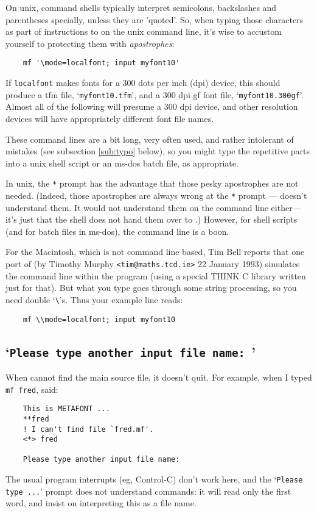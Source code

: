 On {\sc unix}, command shells typically interpret semicolons,
backslashes and parentheses specially, unless they are 'quoted'.
So, when typing those characters as part of instructions to \MF{}
on the {\sc unix} command line, it's wise to accustom
yourself to protecting them with {\em apostrophes\/}:
\begin{verbatim}
    mf '\mode=localfont; input myfont10'
\end{verbatim}
If {\tt localfont} makes fonts for a 300 dots per inch (dpi) device,
this should produce a {\sc tfm} file, `{\tt myfont10.tfm}',
and a 300 dpi {\sc gf} font file, `{\tt myfont10.300gf}'.
Almost all of the following will presume a 300 dpi device, and other
resolution devices will have appropriately different font file names.

These command lines are a bit long, very often used, and rather
intolerant of mistakes (see subsection \ref{sub:typo} below),
so you might type the repetitive parts into a {\sc unix} shell script
or an {\sc ms-dos} batch file, as appropriate.

In {\sc unix}, the {\tt **} prompt has the advantage that those pesky
apostrophes are not needed.  (Indeed, those apostrophes are always
wrong at the {\tt **} prompt --- \MF{} doesn't understand them.
It would not understand them on the command line either---it's just
that the shell does not hand them over to \MF{}.)
However, for shell scripts (and for batch files in {\sc ms-dos}),
the command line is a boon.

For the Macintosh, which is not command line based,
Tim {\sc Bell} reports that one port of \MF{}
(by Timothy {\sc Murphy\/} {\tt <tim@maths.tcd.ie>} 22 January 1993)
simulates the command line within the program
(using a special THINK C library written just for that).
But what you type goes through some string processing,
so you need double `\verb+\+'s.
Thus your example line reads:
\begin{verbatim}
    mf \\mode=localfont; input myfont10
\end{verbatim}


\subsection{`{\tt Please type another input file name: }'}%
\label{sub:another}

When \MF{} cannot find the main source file, it doesn't quit.
For example, when I typed {\tt mf fred}, \MF{} said:
\begin{verbatim}
    This is METAFONT ...
    **fred
    ! I can't find file `fred.mf'.
    <*> fred

    Please type another input file name:
\end{verbatim}
The usual program interrupts (eg, Control-C) don't work here,
and the `{\tt Please type ...}' prompt does not understand
\MF{} commands:  it will read only the first word, and insist on
interpreting this as a file name.

